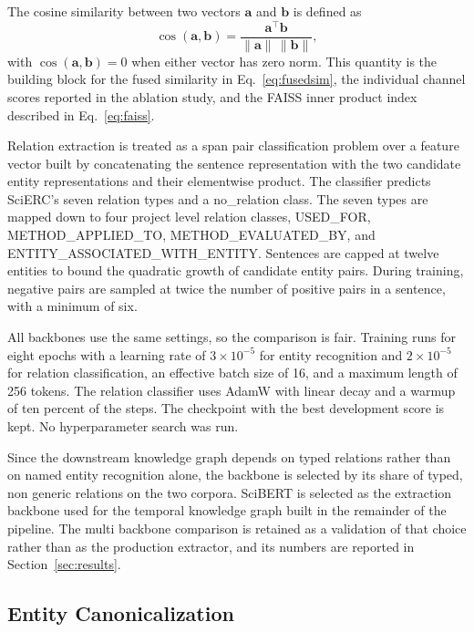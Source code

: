 \documentclass{ieeeaccess}
\begin{document}
The cosine similarity between two vectors $\mathbf{a}$ and $\mathbf{b}$ is defined as
\begin{equation}
\cos(\mathbf{a}, \mathbf{b}) = \frac{\mathbf{a}^{\top}\mathbf{b}}{\|\mathbf{a}\|\,\|\mathbf{b}\|},
\label{eq:cosine}
\end{equation}
with $\cos(\mathbf{a}, \mathbf{b}) = 0$ when either vector has zero norm. This quantity is the building block for the fused similarity in Eq.~\eqref{eq:fusedsim}, the individual channel scores reported in the ablation study, and the FAISS inner product index described in Eq.~\eqref{eq:faiss}.

Relation extraction is treated as a span pair classification problem over a feature vector built by concatenating the sentence representation with the two candidate entity representations and their elementwise product. The classifier predicts SciERC's seven relation types and a no\_relation class. The seven types are mapped down to four project level relation classes, USED\_FOR, METHOD\_APPLIED\_TO, METHOD\_EVALUATED\_BY, and ENTITY\_ASSOCIATED\_WITH\_ENTITY. Sentences are capped at twelve entities to bound the quadratic growth of candidate entity pairs. During training, negative pairs are sampled at twice the number of positive pairs in a sentence, with a minimum of six.

All backbones use the same settings, so the comparison is fair. Training runs for eight epochs with a learning rate of $3\times10^{-5}$ for entity recognition and $2\times10^{-5}$ for relation classification, an effective batch size of 16, and a maximum length of 256 tokens. The relation classifier uses AdamW with linear decay and a warmup of ten percent of the steps. The checkpoint with the best development score is kept. No hyperparameter search was run.

Since the downstream knowledge graph depends on typed relations rather than on named entity recognition alone, the backbone is selected by its share of typed, non generic relations on the two corpora. SciBERT is selected as the extraction backbone used for the temporal knowledge graph built in the remainder of the pipeline. The multi backbone comparison is retained as a validation of that choice rather than as the production extractor, and its numbers are reported in Section~\ref{sec:results}.

\subsection{Entity Canonicalization}
\label{sec:canon}
\end{document}
